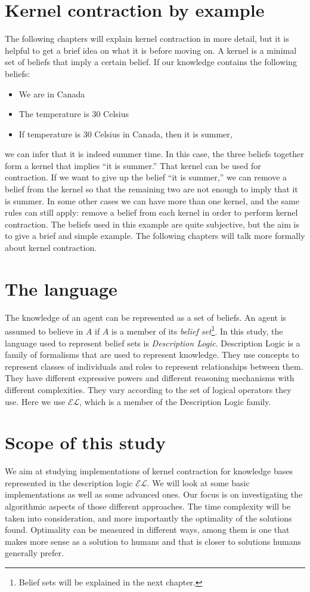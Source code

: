 \section{Kernel contraction by example}
The following chapters will explain kernel contraction in more detail, but it is helpful to get a brief idea on what it is before moving on. A kernel is a minimal set of beliefs that imply a certain belief. If our knowledge contains the following beliefs:
\begin{itemize}
\item We are in Canada
\item The temperature is 30 Celsius
\item If temperature is 30 Celsius in Canada, then it is summer,
\end{itemize}
we can infer that it is indeed summer time. In this case, the three beliefs together form a kernel that implies ``it is summer.'' That kernel can be used for contraction. If we want to give up the belief ``it is summer,'' we can remove a belief from the kernel so that the remaining two are not enough to imply that it is summer. In some other cases we can have more than one kernel, and the same rules can still apply: remove a belief from each kernel in order to perform kernel contraction. The beliefs used in this example are quite subjective, but the aim is to give a brief and simple example. The following chapters will talk more formally about kernel contraction.

\section{The language}
The knowledge of an agent can be represented as a set of beliefs. An agent is assumed to believe in $A$ if $A$ is a member of its \textit{belief set}\footnote{Belief sets will be explained in the next chapter.}. In this study, the language used to represent belief sets is \textit{Description Logic}. Description Logic is a family of formalisms that are used to represent knowledge. They use concepts to represent classes of individuals and roles to represent relationships between them. They have different expressive powers and different reasoning mechanisms with different complexities. They vary according to the set of logical operators they use. Here we use $\mathcal{EL}$, which is a member of the Description Logic family.

\section{Scope of this study}
We aim at studying implementations of kernel contraction for knowledge bases represented in the description logic $\mathcal{EL}$. We will look at some basic implementations as well as some advanced ones. Our focus is on investigating the algorithmic aspects of those different approaches. The time complexity will be taken into consideration, and more importantly the optimality of the solutions found. Optimality can be measured in different ways, among them is one that makes more sense as a solution to humans and that is closer to solutions humans generally prefer.

